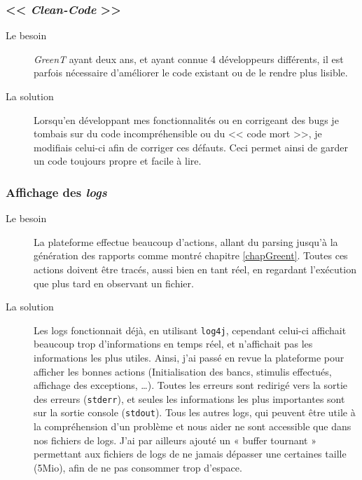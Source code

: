 	\subsubsection{<< \textit{Clean-Code} >>}
		\begin{description}
			\item[Le besoin] \textit{GreenT} ayant deux ans, et ayant connue 4 développeurs différents, il est parfois nécessaire d'améliorer le code existant ou de le rendre plus lisible. 
			\item[La solution] Lorsqu'en développant mes fonctionnalités ou en corrigeant des bugs je tombais sur du code incompréhensible ou du << code mort >>, je modifiais celui-ci afin de corriger ces défauts. Ceci permet ainsi de garder un code toujours propre et facile à lire.
		\end{description}
		
	\subsubsection{Affichage des \textit{logs}}
		\begin{description}
			\item[Le besoin] La plateforme effectue beaucoup d'actions, allant du parsing jusqu'à la génération des rapports comme montré chapitre \ref{chapGreent}. Toutes ces actions doivent être tracés, aussi bien en tant réel, en regardant l'exécution que plus tard en observant un fichier.
			\item[La solution] Les logs fonctionnait déjà, en utilisant \texttt{log4j}, cependant celui-ci affichait beaucoup trop d'informations en temps réel, et n'affichait pas les informations les plus utiles. Ainsi, j'ai passé en revue la plateforme pour afficher les bonnes actions (Initialisation des bancs, stimulis effectués, affichage des exceptions, \ldots). Toutes les erreurs sont redirigé vers la sortie des erreurs (\texttt{stderr}), et seules les informations les plus importantes sont sur la sortie console (\texttt{stdout}). Tous les autres logs, qui peuvent être utile à la compréhension d'un problème et nous aider ne sont accessible que dans nos fichiers de logs. J'ai par ailleurs ajouté un « buffer tournant » permettant aux fichiers de logs de ne jamais dépasser une certaines taille (5Mio), afin de ne pas consommer trop d'espace.
		\end{description}
		

